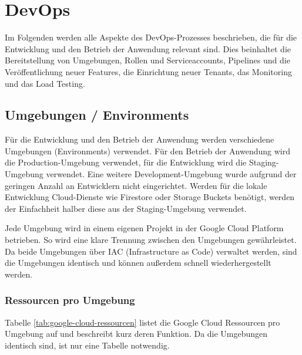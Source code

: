 \section{DevOps}

Im Folgenden werden alle Aspekte des DevOps-Prozesses beschrieben, 
die für die Entwicklung und den Betrieb der Anwendung relevant sind. 
Dies beinhaltet die Bereitstellung von Umgebungen, Rollen und Serviceaccounts, 
Pipelines und die Veröffentlichung neuer Features, die Einrichtung neuer Tenants, 
das Monitoring und das Load Testing.

\subsection{Umgebungen / Environments}

Für die Entwicklung und den Betrieb der Anwendung werden verschiedene Umgebungen (Environments) verwendet.
Für den Betrieb der Anwendung wird die \glqq{}Production\grqq{}-Umgebung verwendet, für 
die Entwicklung wird die \glqq{}Staging\grqq{}-Umgebung verwendet. 
Eine weitere \glqq{}Development\grqq{}-Umgebung wurde aufgrund der geringen Anzahl an Entwicklern 
nicht eingerichtet. Werden für die lokale Entwicklung Cloud-Dienste wie Firestore oder 
Storage Buckets benötigt, werden der Einfachheit halber diese aus der \glqq{}Staging\grqq{}-Umgebung 
verwendet.

Jede Umgebung wird in einem eigenen Projekt in der Google Cloud Platform betrieben.
So wird eine klare Trennung zwischen den Umgebungen gewährleistet.
Da beide Umgebungen über IAC (Infrastructure as Code) verwaltet werden,
sind die Umgebungen identisch und können außerdem schnell wiederhergestellt werden.

\subsubsection{Ressourcen pro Umgebung}

Tabelle \ref{tab:google-cloud-ressourcen} listet die Google Cloud Ressourcen pro Umgebung auf und
beschreibt kurz deren Funktion. Da die Umgebungen identisch sind, ist nur eine Tabelle notwendig.


